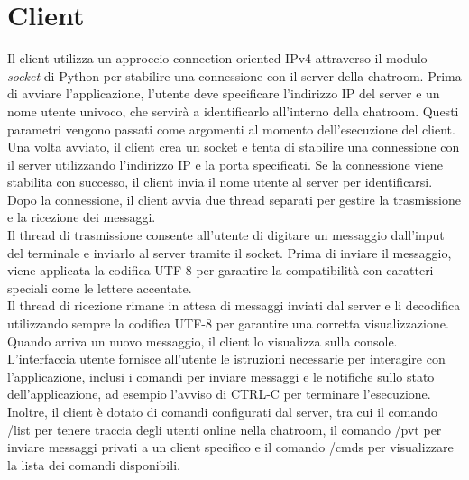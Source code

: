 \documentclass[a4paper,12pt]{report}
\begin{document}
\chapter{Client}
Il client utilizza un approccio connection-oriented IPv4 attraverso il modulo \textit{socket} di Python per stabilire una connessione con il server della chatroom. Prima di avviare l'applicazione, l'utente deve specificare l'indirizzo IP del server e un nome utente univoco, che servirà a identificarlo all'interno della chatroom. Questi parametri vengono passati come argomenti al momento dell'esecuzione del client.
\\
Una volta avviato, il client crea un socket e tenta di stabilire una connessione con il server utilizzando l'indirizzo IP e la porta specificati. Se la connessione viene stabilita con successo, il client invia il nome utente al server per identificarsi.
\\
Dopo la connessione, il client avvia due thread separati per gestire la trasmissione e la ricezione dei messaggi. 
\\
Il thread di trasmissione consente all'utente di digitare un messaggio dall'input del terminale e inviarlo al server tramite il socket. Prima di inviare il messaggio, viene applicata la codifica UTF-8 per garantire la compatibilità con caratteri speciali come le lettere accentate.
\\
Il thread di ricezione rimane in attesa di messaggi inviati dal server e li decodifica utilizzando sempre la codifica UTF-8 per garantire una corretta visualizzazione. Quando arriva un nuovo messaggio, il client lo visualizza sulla console.
\\
L'interfaccia utente fornisce all'utente le istruzioni necessarie per interagire con l'applicazione, inclusi i comandi per inviare messaggi e le notifiche sullo stato dell'applicazione, ad esempio l'avviso di CTRL-C per terminare l'esecuzione.
\\
Inoltre, il client è dotato di comandi configurati dal server, tra cui il comando /list per tenere traccia degli utenti online nella chatroom, il comando /pvt per inviare messaggi privati a un client specifico e il comando /cmds per visualizzare la lista dei comandi disponibili.
\end{document}
